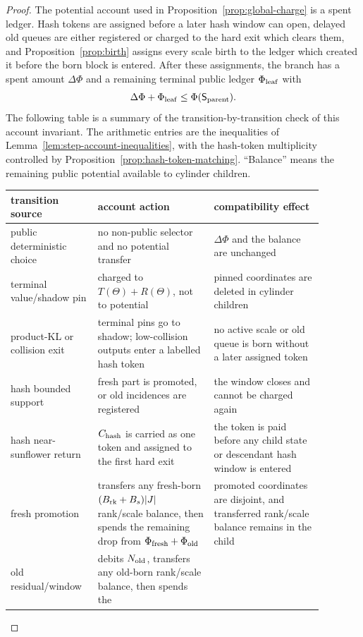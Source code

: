 \documentclass[11pt]{article}
\begin{document}
\begin{proof}
The potential account used in Proposition~\ref{prop:global-charge} is a spent
ledger.  Hash tokens are assigned before a later hash window can open, delayed
old queues are either registered or charged to the hard exit which clears them,
and Proposition~\ref{prop:birth} assigns every scale birth to the ledger which
created it before the born block is entered.  After these assignments, the
branch has a spent amount $\Delta\Phi$ and a remaining terminal public ledger
$\Phi_{\rm leaf}$ with
\[
  \Delta\Phi+\Phi_{\rm leaf}\le \Phi(\mathsf S_{\rm parent}).
\]
The following table is a summary of the transition-by-transition check of this
account invariant.  The arithmetic entries are the inequalities of
Lemma~\ref{lem:step-account-inequalities}, with the hash-token multiplicity
controlled by Proposition~\ref{prop:hash-token-matching}.  ``Balance'' means
the remaining public potential available to cylinder children.
\begin{center}
\scriptsize
\begin{tabular}{p{0.22\linewidth}p{0.34\linewidth}p{0.32\linewidth}}
transition source & account action & compatibility effect\\
\hline
public deterministic choice
& no non-public selector and no potential transfer
& $\Delta\Phi$ and the balance are unchanged\\
terminal value/shadow pin
& charged to $T(\Theta)+R(\Theta)$, not to potential
& pinned coordinates are deleted in cylinder children\\
product-KL or collision exit
& terminal pins go to shadow; low-collision outputs enter a labelled hash token
& no active scale or old queue is born without a later assigned token\\
hash bounded support
& fresh part is promoted, or old incidences are registered
& the window closes and cannot be charged again\\
hash near-sunflower return
& $C_{\rm hash}$ is carried as one token and assigned to the first hard exit
& the token is paid before any child state or descendant hash window is entered\\
fresh promotion
& transfers any fresh-born $(B_{\rm rk}+B_s)|J|$ rank/scale balance, then spends the remaining
drop from $\Phi_{\rm fresh}+\Phi_{\rm old}$
& promoted coordinates are disjoint, and transferred rank/scale balance remains
in the child\\
old residual/window
& debits $N_{\rm old}$, transfers any old-born rank/scale balance, then spends the

\end{tabular}
\end{center}
\end{proof}
\end{document}
